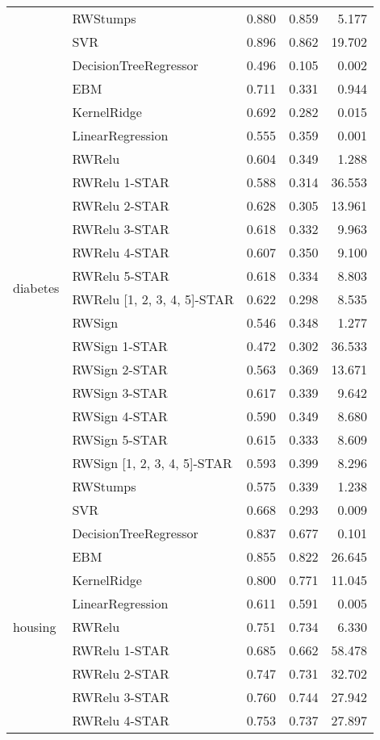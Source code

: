\begin{tabular}{llrrr}
 & RWStumps & 0.880 & 0.859 & 5.177 \\
 & SVR & 0.896 & 0.862 & 19.702 \\
\cline{1-5}
\multirow[t]{20}{*}{diabetes} & DecisionTreeRegressor & 0.496 & 0.105 & 0.002 \\
 & EBM & 0.711 & 0.331 & 0.944 \\
 & KernelRidge & 0.692 & 0.282 & 0.015 \\
 & LinearRegression & 0.555 & 0.359 & 0.001 \\
 & RWRelu & 0.604 & 0.349 & 1.288 \\
 & RWRelu 1-STAR & 0.588 & 0.314 & 36.553 \\
 & RWRelu 2-STAR & 0.628 & 0.305 & 13.961 \\
 & RWRelu 3-STAR & 0.618 & 0.332 & 9.963 \\
 & RWRelu 4-STAR & 0.607 & 0.350 & 9.100 \\
 & RWRelu 5-STAR & 0.618 & 0.334 & 8.803 \\
 & RWRelu [1, 2, 3, 4, 5]-STAR & 0.622 & 0.298 & 8.535 \\
 & RWSign & 0.546 & 0.348 & 1.277 \\
 & RWSign 1-STAR & 0.472 & 0.302 & 36.533 \\
 & RWSign 2-STAR & 0.563 & 0.369 & 13.671 \\
 & RWSign 3-STAR & 0.617 & 0.339 & 9.642 \\
 & RWSign 4-STAR & 0.590 & 0.349 & 8.680 \\
 & RWSign 5-STAR & 0.615 & 0.333 & 8.609 \\
 & RWSign [1, 2, 3, 4, 5]-STAR & 0.593 & 0.399 & 8.296 \\
 & RWStumps & 0.575 & 0.339 & 1.238 \\
 & SVR & 0.668 & 0.293 & 0.009 \\
\cline{1-5}
\multirow[t]{20}{*}{housing} & DecisionTreeRegressor & 0.837 & 0.677 & 0.101 \\
 & EBM & 0.855 & 0.822 & 26.645 \\
 & KernelRidge & 0.800 & 0.771 & 11.045 \\
 & LinearRegression & 0.611 & 0.591 & 0.005 \\
 & RWRelu & 0.751 & 0.734 & 6.330 \\
 & RWRelu 1-STAR & 0.685 & 0.662 & 58.478 \\
 & RWRelu 2-STAR & 0.747 & 0.731 & 32.702 \\
 & RWRelu 3-STAR & 0.760 & 0.744 & 27.942 \\
 & RWRelu 4-STAR & 0.753 & 0.737 & 27.897 \\

\end{tabular}
